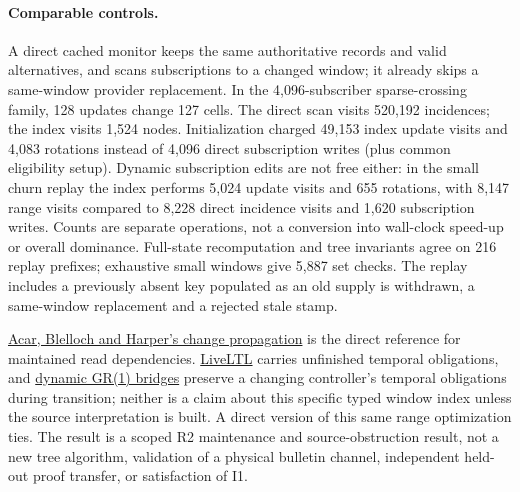 \documentclass[11pt]{article}
\begin{document}
\paragraph{Comparable controls.}
A direct cached monitor keeps the same authoritative records and valid alternatives, and scans subscriptions to a changed window; it already skips a same-window provider replacement. In the 4,096-subscriber sparse-crossing family, 128 updates change 127 cells. The direct scan visits 520,192 incidences; the index visits 1,524 nodes. Initialization charged 49,153 index update visits and 4,083 rotations instead of 4,096 direct subscription writes (plus common eligibility setup). Dynamic subscription edits are not free either: in the small churn replay the index performs 5,024 update visits and 655 rotations, with 8,147 range visits compared to 8,228 direct incidence visits and 1,620 subscription writes. Counts are separate operations, not a conversion into wall-clock speed-up or overall dominance. Full-state recomputation and tree invariants agree on 216 replay prefixes; exhaustive small windows give 5,887 set checks. The replay includes a previously absent key populated as an old supply is withdrawn, a same-window replacement and a rejected stale stamp.

\href{https://www.cs.cmu.edu/~guyb/papers/ABH06.pdf}{Acar, Blelloch and Harper's change propagation} is the direct reference for maintained read dependencies. \href{https://pmc.ncbi.nlm.nih.gov/articles/PMC9468080/}{LiveLTL} carries unfinished temporal obligations, and \href{https://smlab.cs.tau.ac.il/syntech/dupdate/index.html}{dynamic GR(1) bridges} preserve a changing controller's temporal obligations during transition; neither is a claim about this specific typed window index unless the source interpretation is built. A direct version of this same range optimization ties. The result is a scoped R2 maintenance and source-obstruction result, not a new tree algorithm, validation of a physical bulletin channel, independent held-out proof transfer, or satisfaction of I1.
\end{document}

